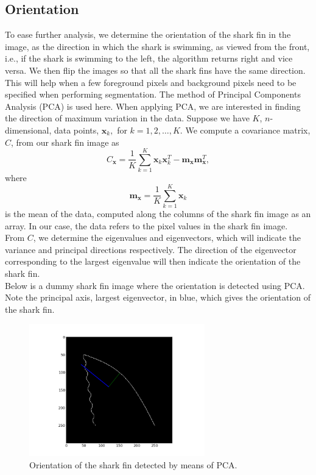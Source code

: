 \documentclass[a4paper,10pt]{article}
\begin{document}
\subsection{Orientation}
\label{orient}
To ease further analysis, we determine the
orientation of the shark fin in the image, as the direction in
which the shark is
swimming, as viewed from the front, i.e., if the shark is swimming to the left,
the algorithm returns right and vice versa.  We then flip the images so that
all the shark fins have the same direction.  This will help when a few foreground
pixels and background pixels need to be specified when performing segmentation.
The method of Principal Components Analysis (PCA) is used here.  When applying
PCA, we are interested in finding the direction of maximum variation in the
data.  Suppose we have $K$, $n$-dimensional, data points, $\mathbf{x}_k,$ for
$k=1,2, \ldots ,K$.  We compute a covariance matrix, $C$, from our shark fin image as 
\[
 C_{\mathbf{x}} = \frac{1}{K} \sum_{k=1}^{K} \mathbf{x}_{k}\mathbf{x}_{k}^{T} -
\mathbf{m}_{\mathbf{x}}\mathbf{m}_{\mathbf{x}}^{T} 
,\]
where
\[
 \mathbf{m}_{\mathbf{x}} = \frac{1}{K} \sum_{k=1}^{K}\mathbf{x}_{k}
\]
is the mean of the data, computed along the columns of the shark fin image as an array. 
In our case, the data refers to the pixel values in the shark fin image.  \\

From $C$, we determine the eigenvalues and eigenvectors, which will indicate the
variance and principal directions respectively.
The direction of the eigenvector corresponding to the largest eigenvalue will
then indicate the orientation of the shark fin. \\

Below is a dummy shark fin image where the orientation is detected using PCA.
Note the principal axis, largest eigenvector, in blue, which gives the
orientation of the shark fin.
\begin{figure}[H]
 \centering
 \includegraphics[width=3in]{orientation.jpg}
 \caption{Orientation of the shark fin detected by means of PCA.}
 \label{orientation}
\end{figure}
\end{document}

